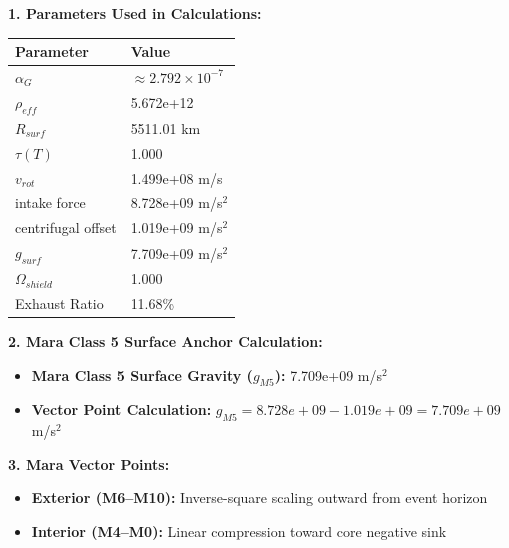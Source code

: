 \documentclass[11pt, a4paper]{article}
\begin{document}
\vspace{0.5em}
\noindent \textbf{1. Parameters Used in Calculations:}
\begin{center}
  \begin{tabular}{|l|l|}
    \hline
    \textbf{Parameter} & \textbf{Value} \\ \hline
    $\alpha_G$ & $\approx 2.792 \times 10^{-7}$ \\ \hline
    $\rho_{eff}$ & 5.672e+12 \\ \hline
    $R_{surf}$ & 5511.01 km \\ \hline
    $\tau(T)$ & 1.000 \\ \hline
    $v_{rot}$ & 1.499e+08 m/s \\ \hline
    intake force & 8.728e+09 m/s$^2$ \\ \hline
    centrifugal offset & 1.019e+09 m/s$^2$ \\ \hline
    $g_{surf}$ & 7.709e+09 m/s$^2$ \\ \hline
    $\Omega_{shield}$ & 1.000 \\ \hline
    Exhaust Ratio & 11.68\% \\ \hline
  \end{tabular}
\end{center}

\vspace{0.5em}
\noindent \textbf{2. Mara Class 5 Surface Anchor Calculation:}
\begin{itemize}
  \item \textbf{Mara Class 5 Surface Gravity ($g_{M5}$):} 7.709e+09 m/s$^2$
  \item \textbf{Vector Point Calculation:} $g_{M5} = 8.728e+09 - 1.019e+09 = 7.709e+09$ m/s$^2$
\end{itemize}

\vspace{0.5em}
\noindent \textbf{3. Mara Vector Points:}
\begin{itemize}
  \item \textbf{Exterior (M6--M10):} Inverse-square scaling outward from event horizon
  \item \textbf{Interior (M4--M0):} Linear compression toward core negative sink
\end{itemize}
\end{document}

